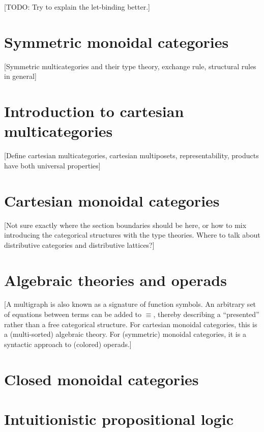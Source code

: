 \documentclass{book}
\begin{document}
[TODO: Try to explain the let-binding better.]



\section{Symmetric monoidal categories}
\label{sec:symmoncat}

[Symmetric multicategories and their type theory, exchange rule, structural rules in general]


\section{Introduction to cartesian multicategories}
\label{sec:cartmulti}

[Define cartesian multicategories, cartesian multiposets, representability, products have both universal properties]


\section{Cartesian monoidal categories}
\label{sec:cartmoncat}

[Not sure exactly where the section boundaries should be here, or how to mix introducing the categorical structures with the type theories.
Where to talk about distributive categories and distributive lattices?]


\section{Algebraic theories and operads}
\label{sec:algthy-opd}

[A multigraph is also known as a signature of function symbols.  An arbitrary set of equations between terms can be added to $\equiv$, thereby describing a ``presented'' rather than a free categorical structure.  For cartesian monoidal categories, this is a (multi-sorted) algebraic theory.  For (symmetric) monoidal categories, it is a syntactic approach to (colored) operads.]


\section{Closed monoidal categories}
\label{sec:clmoncat}


\section{Intuitionistic propositional logic}
\label{sec:int-logic}
\end{document}
